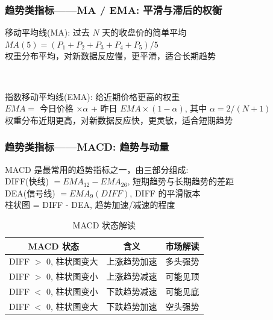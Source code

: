 \begin{frame}
    \frametitle{趋势类指标——MA / EMA: 平滑与滞后的权衡}

    \alert{移动平均线(MA)}: 过去 $N$ 天的收盘价的简单平均 \\
    \hspace{2em} $MA(5) = (P_1 + P_2 + P_3 + P_4 + P_5) / 5$ \\
    \hspace{2em} 权重分布平均，对新数据反应慢，更平滑，适合长期趋势

    ~\par
    \alert{指数移动平均线(EMA)}: 给近期价格更高的权重 \\
    \hspace{2em} $EMA = $ 今日价格 $\times \alpha$ + 昨日 $EMA \times (1 - \alpha)$, 其中 $\alpha = 2 / (N + 1)$ \\
    \hspace{2em} 权重分布近期更高，对新数据反应快，更灵敏，适合短期趋势
\end{frame}

\begin{frame}
    \frametitle{趋势类指标——MACD: 趋势与动量}

    MACD 是最常用的趋势指标之一，由三部分组成: \\
    \hspace{2em} \alert{DIFF(快线)} $= EMA_{12} - EMA_{26}$, 短期趋势与长期趋势的差距 \\
    \hspace{2em} \alert{DEA(信号线)} $= EMA_9(DIFF)$, DIFF 的平滑版本\\
    \hspace{2em} 柱状图 = DIFF - DEA, 趋势加速/减速的程度 \\

    \begin{table}[htbp]
        \centering
        \caption{MACD 状态解读}
        \begin{tabular}{ccc}
            \toprule
            MACD 状态 & 含义 & 市场解读 \\
            \midrule
            DIFF $>$ 0, 柱状图变大 & 上涨趋势加速 & 多头强势 \\
            DIFF $>$ 0, 柱状图变小 & 上涨趋势减速 & 可能见顶 \\
            DIFF $<$ 0, 柱状图变小 & 下跌趋势减速 & 可能见底 \\
            DIFF $<$ 0, 柱状图变大 & 下跌趋势加速 & 空头强势 \\
            \bottomrule
        \end{tabular}
    \end{table}
\end{frame}


